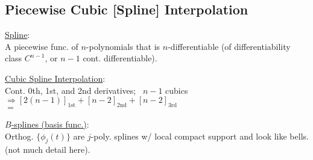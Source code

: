 \documentclass[12pt]{article}
\begin{document}
\subsection{Piecewise Cubic [Spline] Interpolation}

\parbox[t]{4.5cm}{
    \underline{Spline}: \\[4pt] 
    {\scriptsize 
        A piecewise func. of \(n\)-polynomials that is \(n\)-differentiable (of differentiability class \(C^{n-1}\), 
        or \(n-1\) cont. differentiable).
    }
}
\hspace{.75cm}
\parbox[t]{6.5cm}{
    \underline{Cubic Spline Interpolation}: \\[5pt] 
    {\scriptsize 
        Cont. 0th, 1st, and 2nd derivatives; \ \(n-1\) cubics \\
        \(\Rightarrow [2(n-1)]_\text{1st} + [n-2]_\text{2nd} + [n-2]_\text{3rd}\)\\
        \(=\) 
    }
}
\hspace{.75cm}
\parbox[t]{4.5cm}{
    \underline{\(B\)-splines (basis func.)}: \\[4pt] 
    {\scriptsize 
        Orthog. \(\{\phi_j(t)\}\) are \(j\)-poly. splines w/ local compact support and look like bells.
        (not much detail here).
    }
}
\end{document}
